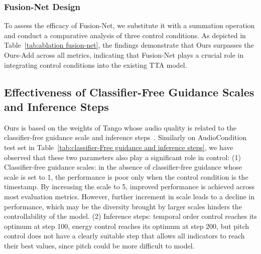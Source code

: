 \documentclass[letterpaper]{article}
\begin{document}
\begin{table}[!h]\footnotesize
    \centering
    \caption{The control performance with different designs for the Fusion-Net.}
    \label{tab:ablation fusion-net}
\end{table}

\subsubsection{Fusion-Net Design} To assess the efficacy of Fusion-Net, we substitute it with a summation operation and conduct a comparative analysis of three control conditions. As depicted in Table~\ref{tab:ablation fusion-net}, the findings demonstrate that Ours surpasses the Ours-Add across all metrics, indicating that Fusion-Net plays a crucial role in integrating control conditions into the existing TTA model.

\subsection{Effectiveness of Classifier-Free Guidance Scales and Inference Steps}

Ours is based on the weights of Tango whose audio quality is related to the classifier-free guidance scale and inference steps~\cite{ghosal2023tango}. Similarly on AudioCondition test set in Table~\ref{tab:classifier-Free guidance and inference steps}, we have observed that these two parameters also play a significant role in control: (1) Classifier-free guidance scales: in the absence of classifier-free guidance whose scale is set to 1, the performance is poor only when the control condition is the timestamp. By increasing the scale to 5, improved performance is achieved across most evaluation metrics. However, further increment in scale leads to a decline in performance, which may be the diversity brought by larger scales hinders the controllability of the model. (2) Inference steps: temporal order control reaches its optimum at step 100, energy control reaches its optimum at step 200, but pitch control does not have a clearly suitable step that allows all indicators to reach their best values, since pitch could be more difficult to model.
\end{document}
